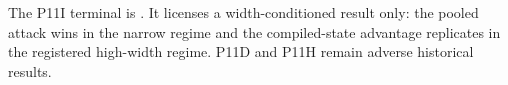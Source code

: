 {}The P11I terminal is . It licenses a width-conditioned result only: the pooled attack wins in the narrow regime and the compiled-state advantage replicates in the registered high-width regime. P11D and P11H remain adverse historical results.
\markdownRendererSectionEnd 
\markdownRendererSectionEnd \markdownRendererDocumentEnd